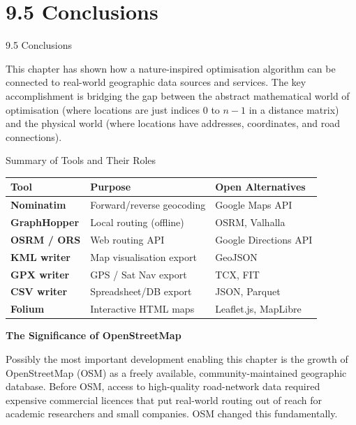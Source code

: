 \documentclass[aspectratio=169,10pt]{beamer}
\begin{document}
\section{9.5 Conclusions}

\begin{frame}[allowframebreaks]{9.5 Conclusions}

  This chapter has shown how a nature-inspired optimisation algorithm can
  be connected to real-world geographic data sources and services.  The
  key accomplishment is bridging the gap between the abstract mathematical
  world of optimisation (where locations are just indices 0 to $n-1$ in a
  distance matrix) and the physical world (where locations have addresses,
  coordinates, and road connections).

  \begin{block}{Summary of Tools and Their Roles}
    \centering
    \renewcommand{\arraystretch}{1.3}
    \begin{tabular}{>{\bfseries}p{2.6cm} p{4.4cm} p{4.0cm}}
      \toprule
      \textbf{Tool} & \textbf{Purpose} & \textbf{Open Alternatives} \\
      \midrule
      Nominatim & Forward/reverse geocoding & Google Maps API \\
      GraphHopper & Local routing (offline) & OSRM, Valhalla \\
      OSRM / ORS & Web routing API & Google Directions API \\
      KML writer & Map visualisation export & GeoJSON \\
      GPX writer & GPS / Sat Nav export & TCX, FIT \\
      CSV writer & Spreadsheet/DB export & JSON, Parquet \\
      Folium & Interactive HTML maps & Leaflet.js, MapLibre \\
      \bottomrule
    \end{tabular}
  \end{block}

  \framebreak

  \textbf{The Significance of OpenStreetMap}

  \medskip
  Possibly the most important development enabling this chapter is the growth
  of OpenStreetMap (OSM) as a freely available, community-maintained
  geographic database.  Before OSM, access to high-quality road-network
  data required expensive commercial licences that put real-world routing
  out of reach for academic researchers and small companies.  OSM changed
  this fundamentally.


\end{frame}
\end{document}

